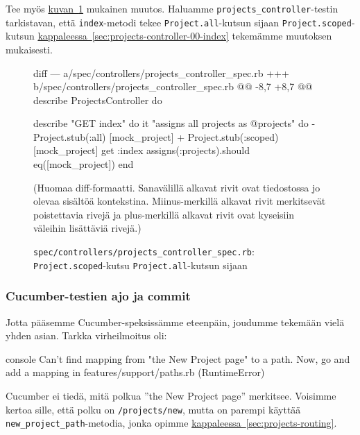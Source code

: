 \documentclass{article}
\newenvironment{myfigure}[1][tbp]{
  \begin{figure}[#1]
    \centering
    \begin{lrbox}{\myfigurebox}
      \begin{minipage}{\textwidth}
}{
      \end{minipage}
    \end{lrbox}
    \colorbox{blue!4}{\usebox{\myfigurebox}}
  \end{figure}
}
\newcommand{\myref}[2]{\hyperref[#2]{#1~\ref*{#2}}}
\newcommand{\pdfforeignlanguage}[2]{\texorpdfstring{\foreignlanguage{#1}{#2}}{#2}}
\newcommand{\eng}[1]{\pdfforeignlanguage{english}{#1}}
\begin{document}
\begin{samepage}
Tee myös \myref{kuvan}{fig:projects-controller-spec-scoped-call} mukainen
muutos. Haluamme \texttt{projects\_controller}-testin tarkistavan, että
\texttt{index}-metodi tekee \texttt{Project.all}-kutsun sijaan
\texttt{Project.scoped}-kutsun
\myref{kappaleessa}{sec:projects-controller-00-index} tekemämme muutoksen
mukaisesti.

\begin{myfigure}[H]
\caption{\texttt{spec/controllers/projects\_controller\_spec.rb}:
\texttt{Project.scoped}-kutsu \texttt{Project.all}-kutsun sijaan}
\label{fig:projects-controller-spec-scoped-call}

\begin{pygmented}{diff}
--- a/spec/controllers/projects_controller_spec.rb
+++ b/spec/controllers/projects_controller_spec.rb
@@ -8,7 +8,7 @@ describe ProjectsController do
 
   describe "GET index" do
     it "assigns all projects as @projects" do
-      Project.stub(:all) { [mock_project] }
+      Project.stub(:scoped) { [mock_project] }
       get :index
       assigns(:projects).should eq([mock_project])
     end
\end{pygmented}

(Huomaa diff-formaatti. Sanavälillä alkavat rivit ovat tiedostossa jo olevaa
sisältöä kontekstina. Miinus-merkillä alkavat rivit merkitsevät poistettavia
rivejä ja plus-merkillä alkavat rivit ovat kyseisiin väleihin lisättäviä
rivejä.)
\end{myfigure}
\end{samepage}

\subsubsection{Cucumber-testien ajo ja commit}

\begin{samepage}
Jotta pääsemme Cucumber-speksissämme eteenpäin, joudumme tekemään vielä yhden
asian. Tarkka virheilmoitus oli:

\begin{pygmented}{console}
      Can't find mapping from "the New Project page" to a path.
      Now, go and add a mapping in features/support/paths.rb (RuntimeError)
\end{pygmented}
\end{samepage}

Cucumber ei tiedä, mitä polkua ''\eng{the New Project page}'' merkitsee.
Voisimme kertoa sille, että polku on \texttt{/projects/new}, mutta on parempi
käyttää \texttt{new\_project\_path}-metodia, jonka opimme
\myref{kappaleessa}{sec:projects-routing}.
\end{document}

